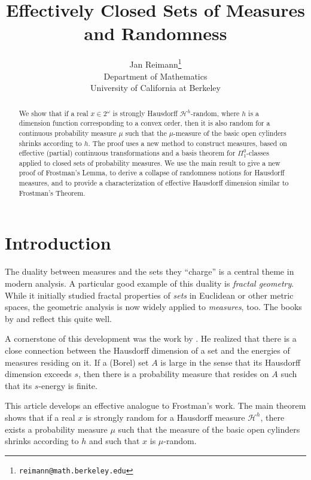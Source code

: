 \documentclass[11pt,reqno]{article}
\title{Effectively Closed Sets of Measures and Randomness}
\author{Jan Reimann\thanks{\texttt{reimann@math.berkeley.edu}} \\[2ex] {\small Department of Mathematics}\\ {\small University of California at Berkeley}}
\date{}
\theoremstyle{plain}
\theoremstyle{definition}
\theoremstyle{remark}
\numberwithin{equation}{section}
\newcommand{\Cant}{\ensuremath{2^{\omega}}}
\newcommand{\Hmeas}{\ensuremath{\mathcal{H}}}
\newcommand{\Hm}[1]{\ensuremath{\Hmeas^{#1}}}
\begin{document}
\maketitle
	

	\begin{abstract}	
	  We show that if a real $x \in \Cant$ is strongly Hausdorff $\Hm{h}$-random, where $h$ is a dimension function corresponding to a convex order, then it is also random for a continuous probability measure $\mu$ such that the $\mu$-measure of the basic open cylinders shrinks according to $h$. The proof uses a new method to construct measures, based on effective (partial) continuous transformations and a basis theorem for $\Pi^0_1$-classes applied to closed sets of probability measures. We use the main result to give a new proof of Frostman's Lemma, to derive a collapse of randomness notions for Hausdorff measures, and to provide a characterization of effective Hausdorff dimension similar to Frostman's Theorem.
	\end{abstract}



% 
% 
\section{Introduction} \label{sec-intro}
% 
The duality between measures and the sets they ``charge'' is a central theme in modern analysis. A particular good example of this duality is \emph{fractal geometry}. While it initially studied fractal properties of \emph{sets} in Euclidean or other metric spaces, the geometric analysis is now widely applied to \emph{measures}, too. The books by \citet{mattila:1995} and \citet{edgar:1998} reflect this quite well.

A cornerstone of this development was the work by \citet{frostman:1935}. He realized that there is a close connection between the Hausdorff dimension of a set and the energies of measures residing on it. If a (Borel) set $A$ is large in the sense that its Hausdorff dimension exceeds $s$, then there is a probability measure that resides on $A$ such that its $s$-energy is finite.


\medskip
This article develops an effective analogue to Frostman's work. The main theorem shows that if a real $x$ is strongly random for a Hausdorff measure $\Hm{h}$, there exists a probability measure $\mu$ such that the measure of the basic open cylinders shrinks according to $h$ and such that $x$ is $\mu$-random.
\end{document}
